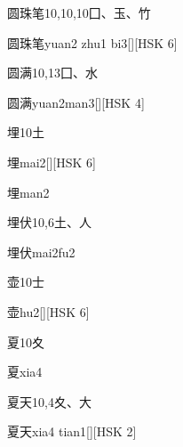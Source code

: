 \begin{Entry}{圆珠笔}{10,10,10}{⼞、⽟、⽵}
  \begin{Phonetics}{圆珠笔}{yuan2 zhu1 bi3}[][HSK 6]
  \end{Phonetics}
\end{Entry}

\begin{Entry}{圆满}{10,13}{⼞、⽔}
  \begin{Phonetics}{圆满}{yuan2man3}[][HSK 4]
  \end{Phonetics}
\end{Entry}

\begin{Entry}{埋}{10}{⼟}
  \begin{Phonetics}{埋}{mai2}[][HSK 6]
  \end{Phonetics}
  \begin{Phonetics}{埋}{man2}
  \end{Phonetics}
\end{Entry}

\begin{Entry}{埋伏}{10,6}{⼟、⼈}
  \begin{Phonetics}{埋伏}{mai2fu2}
  \end{Phonetics}
\end{Entry}

\begin{Entry}{壶}{10}{⼠}
  \begin{Phonetics}{壶}{hu2}[][HSK 6]
  \end{Phonetics}
\end{Entry}

\begin{Entry}{夏}{10}{⼢}
  \begin{Phonetics}{夏}{xia4}
  \end{Phonetics}
\end{Entry}

\begin{Entry}{夏天}{10,4}{⼢、⼤}
  \begin{Phonetics}{夏天}{xia4 tian1}[][HSK 2]
  \end{Phonetics}
\end{Entry}

